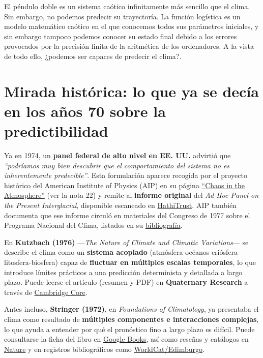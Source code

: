 \documentclass[
  10pt,
  a4paper,
  DIV=11,
  numbers=noendperiod,
  open=any]{scrreprt}
\numberwithin{equation}{chapter}
\numberwithin{equation}{chapter}
\renewcommand{\[}{\begin{equation}}
\renewcommand{\]}{\end{equation}}
\begin{document}
El péndulo doble es un sistema caótico infinitamente más sencillo que el
clima. Sin embargo, no podemos predecir su trayectoría. La función
logística es un modelo matemático caótico en el que conocemos todos sus
parámetros iniciales, y sin embargo tampoco podemos conocer su estado
final debido a los errores provocados por la precisión finita de la
aritmética de los ordenadores. A la vista de todo ello, ¿podemos ser
capaces de predecir el clima?.

\section{Mirada histórica: lo que ya se decía en los años 70 sobre la
predictibilidad}\label{mirada-histuxf3rica-lo-que-ya-se-decuxeda-en-los-auxf1os-70-sobre-la-predictibilidad}

Ya en 1974, un \textbf{panel federal de alto nivel en EE. UU.} advirtió
que \emph{``podríamos muy bien descubrir que el comportamiento del
sistema no es inherentemente predecible''}. Esta formulación aparece
recogida por el proyecto histórico del American Institute of Physics
(AIP) en su página
\href{https://history.aip.org/climate/chaos.htm}{``Chaos in the
Atmosphere''} (ver la nota 22) y remite al \textbf{informe original} del
\emph{Ad Hoc Panel on the Present Interglacial}, disponible escaneado en
\href{https://babel.hathitrust.org/cgi/pt?id=uc1.31822000471953}{HathiTrust}.
AIP también documenta que ese informe circuló en materiales del Congreso
de 1977 sobre el Programa Nacional del Clima, listados en su
\href{https://history.aip.org/climate/bib.htm}{bibliografía}.

En \textbf{Kutzbach (1976)} ---\emph{The Nature of Climate and Climatic
Variations}--- se describe el clima como un \textbf{sistema acoplado}
(atmósfera-océanos-criósfera-litosfera-biosfera) capaz de
\textbf{fluctuar en múltiples escalas temporales}, lo que introduce
límites prácticos a una predicción determinista y detallada a largo
plazo. Puede leerse el artículo (resumen y PDF) en \textbf{Quaternary
Research} a través de
\href{https://www.cambridge.org/core/services/aop-cambridge-core/content/view/66CAC8CC9924C70498DFFD08287437FB/S0033589400035560a.pdf/nature_of_climate_and_climatic_variations1.pdf}{Cambridge
Core}.

Antes incluso, \textbf{Stringer (1972)}, en \emph{Foundations of
Climatology}, ya presentaba el clima como resultado de \textbf{múltiples
componentes e interacciones complejas}, lo que ayuda a entender por qué
el pronóstico fino a largo plazo es difícil. Puede consultarse la ficha
del libro en
\href{https://books.google.com/books/about/Foundations_of_Climatology_an_Introducti.html?id=_BROwAEACAAJ}{Google
Books}, así como reseñas y catálogos en
\href{https://www.nature.com/articles/239472a0}{Nature} y en registros
bibliográficos como
\href{https://discovered.ed.ac.uk/discovery/fulldisplay?adaptor=Local+Search+Engine&context=L&docid=alma99260793502466&lang=en&tab=Everything&vid=44UOE_INST\%3A44UOE_VU2}{WorldCat/Edimburgo}.
\end{document}
